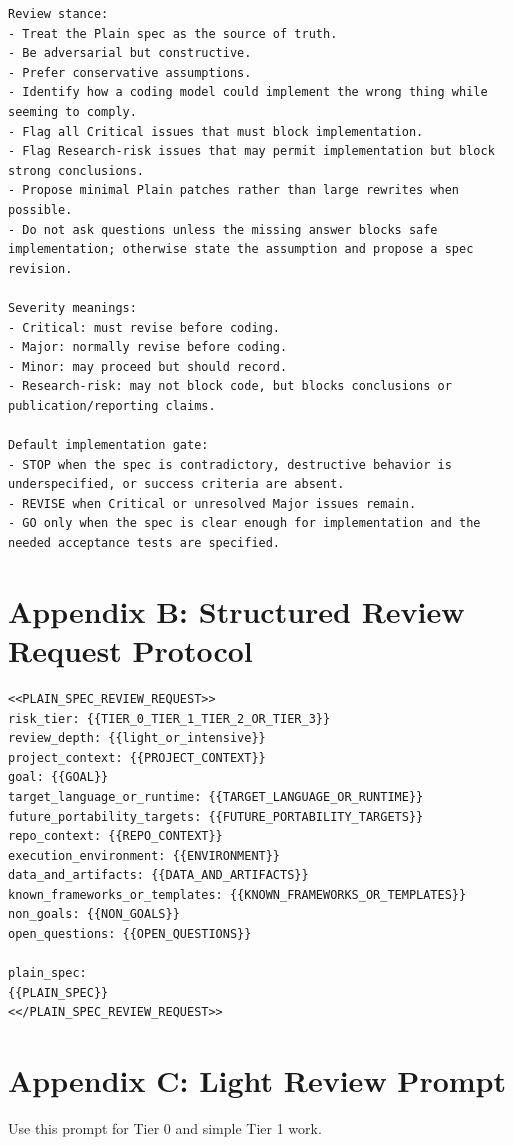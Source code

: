 \documentclass[11pt]{article}
\begin{document}
\begin{lstlisting}
Review stance:
- Treat the Plain spec as the source of truth.
- Be adversarial but constructive.
- Prefer conservative assumptions.
- Identify how a coding model could implement the wrong thing while seeming to comply.
- Flag all Critical issues that must block implementation.
- Flag Research-risk issues that may permit implementation but block strong conclusions.
- Propose minimal Plain patches rather than large rewrites when possible.
- Do not ask questions unless the missing answer blocks safe implementation; otherwise state the assumption and propose a spec revision.

Severity meanings:
- Critical: must revise before coding.
- Major: normally revise before coding.
- Minor: may proceed but should record.
- Research-risk: may not block code, but blocks conclusions or publication/reporting claims.

Default implementation gate:
- STOP when the spec is contradictory, destructive behavior is underspecified, or success criteria are absent.
- REVISE when Critical or unresolved Major issues remain.
- GO only when the spec is clear enough for implementation and the needed acceptance tests are specified.
\end{lstlisting}

\section{Appendix B: Structured Review Request Protocol}

\begin{lstlisting}
<<PLAIN_SPEC_REVIEW_REQUEST>>
risk_tier: {{TIER_0_TIER_1_TIER_2_OR_TIER_3}}
review_depth: {{light_or_intensive}}
project_context: {{PROJECT_CONTEXT}}
goal: {{GOAL}}
target_language_or_runtime: {{TARGET_LANGUAGE_OR_RUNTIME}}
future_portability_targets: {{FUTURE_PORTABILITY_TARGETS}}
repo_context: {{REPO_CONTEXT}}
execution_environment: {{ENVIRONMENT}}
data_and_artifacts: {{DATA_AND_ARTIFACTS}}
known_frameworks_or_templates: {{KNOWN_FRAMEWORKS_OR_TEMPLATES}}
non_goals: {{NON_GOALS}}
open_questions: {{OPEN_QUESTIONS}}

plain_spec:
{{PLAIN_SPEC}}
<</PLAIN_SPEC_REVIEW_REQUEST>>
\end{lstlisting}

\section{Appendix C: Light Review Prompt}

Use this prompt for Tier 0 and simple Tier 1 work.
\end{document}
